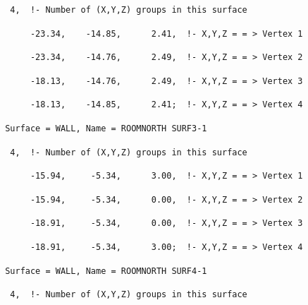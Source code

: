 \begin{lstlisting}
  4,  !- Number of (X,Y,Z) groups in this surface
\end{lstlisting}

\begin{lstlisting}
      -23.34,    -14.85,      2.41,  !- X,Y,Z = = > Vertex 1
\end{lstlisting}

\begin{lstlisting}
      -23.34,    -14.76,      2.49,  !- X,Y,Z = = > Vertex 2
\end{lstlisting}

\begin{lstlisting}
      -18.13,    -14.76,      2.49,  !- X,Y,Z = = > Vertex 3
\end{lstlisting}

\begin{lstlisting}
      -18.13,    -14.85,      2.41;  !- X,Y,Z = = > Vertex 4
\end{lstlisting}

\begin{lstlisting}
 Surface = WALL, Name = ROOMNORTH SURF3-1
\end{lstlisting}

\begin{lstlisting}
  4,  !- Number of (X,Y,Z) groups in this surface
\end{lstlisting}

\begin{lstlisting}
      -15.94,     -5.34,      3.00,  !- X,Y,Z = = > Vertex 1
\end{lstlisting}

\begin{lstlisting}
      -15.94,     -5.34,      0.00,  !- X,Y,Z = = > Vertex 2
\end{lstlisting}

\begin{lstlisting}
      -18.91,     -5.34,      0.00,  !- X,Y,Z = = > Vertex 3
\end{lstlisting}

\begin{lstlisting}
      -18.91,     -5.34,      3.00;  !- X,Y,Z = = > Vertex 4
\end{lstlisting}

\begin{lstlisting}
 Surface = WALL, Name = ROOMNORTH SURF4-1
\end{lstlisting}

\begin{lstlisting}
  4,  !- Number of (X,Y,Z) groups in this surface
\end{lstlisting}

